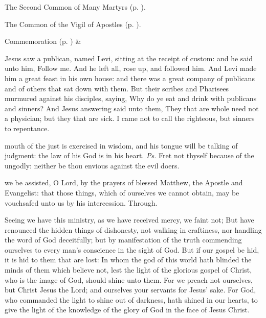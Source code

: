
\begin{rubric}
	The Second Common of Many Martyrs (p. \pageref{CommonMartyrsII}).
\end{rubric}



\begin{rubric}
	The Common of the Vigil of Apostles (p. \pageref{CommonVigilApostles}).
\end{rubric}
\begin{rubric}
	Commemoration  (p. \pageref{SPSaints}) \& 
\end{rubric}

 Jesus saw a publican, named Levi, sitting at the receipt of custom: and he said unto him, Follow me. And he left all, rose up, and followed him. And Levi made him a great feast in his own house: and there was a great company of publicans and of others that sat down with them. But their scribes and Pharisees murmured against his disciples, saying, Why do ye eat and drink with publicans and sinners? And Jesus answering said unto them, They that are whole need not a physician; but they that are sick. I came not to call the righteous, but sinners to repentance.



\introit
{} mouth of the just is exercised in wisdom, and his tongue will be talking of judgment: the law of his God is in his heart. \textit{Ps.} Fret not thyself because of the ungodly: neither be thou envious against the evil doers.

\collect
{} we be assisted, O Lord, by the prayers of blessed Matthew, the Apostle and Evangelist: that those things, which of ourselves we cannot obtain, may be vouchsafed unto us by his intercession. Through.

 Seeing we have this ministry, as we have received mercy, we faint not; But have renounced the hidden things of dishonesty, not walking in craftiness, nor handling the word of God deceitfully; but by manifestation of the truth commending ourselves to every man's conscience in the sight of God. But if our gospel be hid, it is hid to them that are lost: In whom the god of this world hath blinded the minds of them which believe not, lest the light of the glorious gospel of Christ, who is the image of God, should shine unto them. For we preach not ourselves, but Christ Jesus the Lord; and ourselves your servants for Jesus' sake. For God, who commanded the light to shine out of darkness, hath shined in our hearts, to give the light of the knowledge of the glory of God in the face of Jesus Christ.

